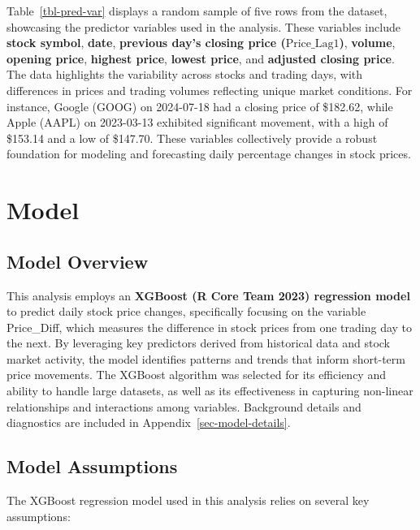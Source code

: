 \documentclass[
  letterpaper,
  DIV=11,
  numbers=noendperiod]{scrartcl}
\begin{document}
Table~\ref{tbl-pred-var} displays a random sample of five rows from the
dataset, showcasing the predictor variables used in the analysis. These
variables include \textbf{stock symbol}, \textbf{date}, \textbf{previous
day's closing price (\(\text{Price\_Lag1}\))}, \textbf{volume},
\textbf{opening price}, \textbf{highest price}, \textbf{lowest price},
and \textbf{adjusted closing price}. The data highlights the variability
across stocks and trading days, with differences in prices and trading
volumes reflecting unique market conditions. For instance, Google (GOOG)
on 2024-07-18 had a closing price of \$182.62, while Apple (AAPL) on
2023-03-13 exhibited significant movement, with a high of \$153.14 and a
low of \$147.70. These variables collectively provide a robust
foundation for modeling and forecasting daily percentage changes in
stock prices.

\section{Model}\label{model}

\subsection{Model Overview}\label{model-overview}

This analysis employs an \textbf{XGBoost (R Core Team 2023) regression
model} to predict daily stock price changes, specifically focusing on
the variable Price\_Diff, which measures the difference in stock prices
from one trading day to the next. By leveraging key predictors derived
from historical data and stock market activity, the model identifies
patterns and trends that inform short-term price movements. The XGBoost
algorithm was selected for its efficiency and ability to handle large
datasets, as well as its effectiveness in capturing non-linear
relationships and interactions among variables. Background details and
diagnostics are included in Appendix~\ref{sec-model-details}.

\subsection{Model Assumptions}\label{model-assumptions}

The XGBoost regression model used in this analysis relies on several key
assumptions:
\end{document}
